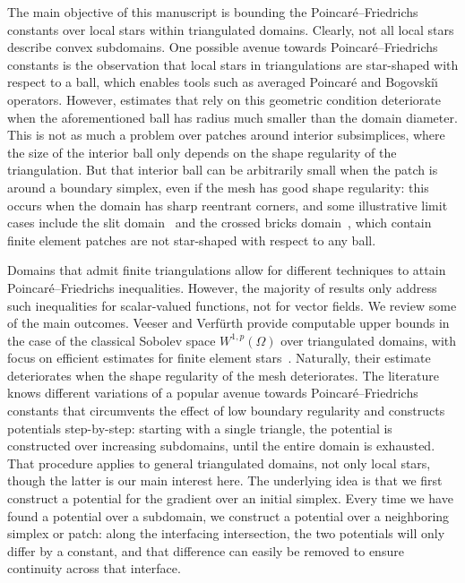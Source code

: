 \documentclass[10pt,letterpaper]{article}
\begin{document}
The main objective of this manuscript is bounding the Poincar\'e--Friedrichs constants over local stars within triangulated domains. 
Clearly, not all local stars describe convex subdomains. 
One possible avenue towards Poincar\'e--Friedrichs constants is the observation that local stars in triangulations are star-shaped with respect to a ball,
which enables tools such as averaged Poincar\'e and Bogovski\u{\i} operators. 
However, estimates that rely on this geometric condition deteriorate when the aforementioned ball has radius much smaller than the domain diameter. 
This is not as much a problem over patches around interior subsimplices, where the size of the interior ball only depends on the shape regularity of the triangulation. 
But that interior ball can be arbitrarily small when the patch is around a boundary simplex, even if the mesh has good shape regularity: 
this occurs when the domain has sharp reentrant corners, and some illustrative limit cases include the slit domain~\cite{veeser2012poincare} and the crossed bricks domain~\cite{licht2019smoothed}, %
which contain finite element patches are not star-shaped with respect to any ball. 

Domains that admit finite triangulations allow for different techniques to attain Poincar\'e--Friedrichs inequalities. 
However, the majority of results only address such inequalities for scalar-valued functions, not for vector fields. 
We review some of the main outcomes. 
Veeser and Verf\"urth provide computable upper bounds in the case of the classical Sobolev space $W^{1,p}(\Omega)$ over triangulated domains, with focus on efficient estimates for finite element stars~\cite{veeser2012poincare}. Naturally, their estimate deteriorates when the shape regularity of the mesh deteriorates. 
% 
The literature~\cite{Eym_Gal_Her_00,vohralik2005discrete,ern2020stable,ern2021finite,Chaum_Voh_p_rob_3D_H_curl_23,Voh_loc_glob_H1_24} knows different variations of a popular avenue towards Poincar\'e--Friedrichs constants that circumvents the effect of low boundary regularity and constructs potentials step-by-step: 
starting with a single triangle, the potential is constructed over increasing subdomains, until the entire domain is exhausted. That procedure applies to general triangulated domains, not only local stars, though the latter is our main interest here. 
The underlying idea is that we first construct a potential for the gradient over an initial simplex. 
Every time we have found a potential over a subdomain, we construct a potential over a neighboring simplex or patch:
along the interfacing intersection, the two potentials will only differ by a constant, 
and that difference can easily be removed to ensure continuity across that interface. 
\end{document}
